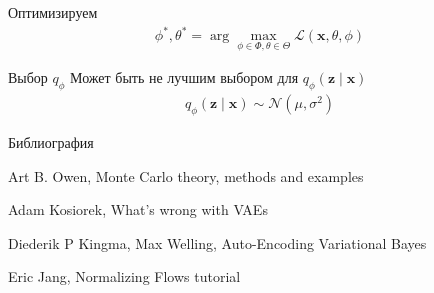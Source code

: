 \documentclass{beamer}
\begin{document}
    \begin{frame}{Оптимизируем}
       \begin{align*}
           \phi^*, \theta^* = \arg \max_{\phi \in \Phi, \theta \in \Theta} \mathcal{L}(\mathbf{x}, \theta, \phi)
       \end{align*} 
    \end{frame}

    \begin{frame}{Выбор $q_\phi$}
       Может быть не лучшим выбором для $q_\phi(\mathbf{z} \mid \mathbf{x})$
       \begin{align*}
           q_\phi(\mathbf{z} \mid \mathbf{x}) \sim \mathcal{N}(\mu, \sigma^2)
       \end{align*} 
    \end{frame}
   
    \begin{frame}{Библиография}
        \begin{thebibliography}{9}
            Art B. Owen, Monte Carlo theory, methods and examples
            
            Adam Kosiorek, What's wrong with VAEs

            Diederik P Kingma, Max Welling, Auto-Encoding Variational Bayes

            Eric Jang, Normalizing Flows tutorial
            
        \end{thebibliography}
    \end{frame}
\end{document}
